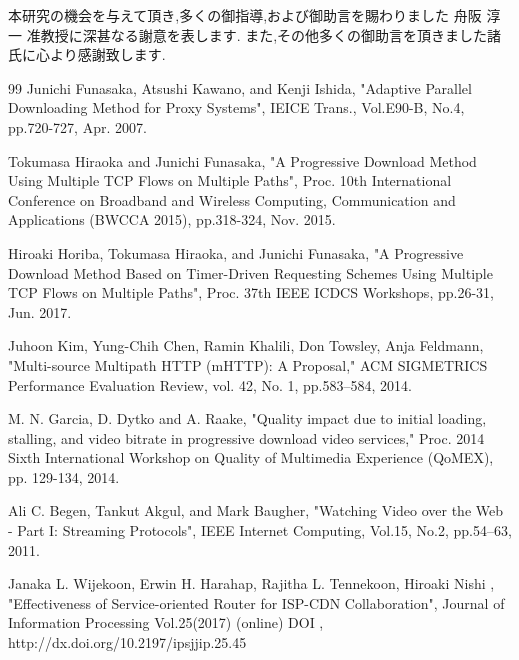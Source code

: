 \documentclass[a4j,12pt]{gradthesis_utf8}
\begin{document}
\clearpage
%
\begin{acknowledgment}
 本研究の機会を与えて頂き,多くの御指導,および御助言を賜わりました
舟阪 淳一 准教授に深甚なる謝意を表します.
また,その他多くの御助言を頂きました諸氏に心より感謝致します.
\end{acknowledgment}
\begin{flushleft}
\begin {thebibliography}{99} 
Junichi Funasaka, Atsushi Kawano, and Kenji Ishida, "Adaptive Parallel Downloading Method for Proxy Systems", IEICE Trans., Vol.E90-B, No.4, pp.720-727, Apr. 2007.

Tokumasa Hiraoka and Junichi Funasaka, "A Progressive Download Method Using Multiple TCP Flows on Multiple Paths", Proc. 10th International Conference on Broadband and Wireless Computing, Communication and Applications (BWCCA 2015), pp.318-324, Nov. 2015. 

Hiroaki Horiba, Tokumasa Hiraoka, and Junichi Funasaka, "A Progressive Download Method Based on Timer-Driven Requesting Schemes Using Multiple TCP Flows on Multiple Paths", Proc. 37th IEEE ICDCS Workshops, pp.26-31, Jun. 2017.

Juhoon Kim, Yung-Chih Chen, Ramin Khalili, Don Towsley, Anja Feldmann,
"Multi-source Multipath HTTP (mHTTP): A Proposal,"
ACM SIGMETRICS Performance Evaluation Review, vol. 42, No. 1, pp.583--584, 2014.

M. N. Garcia, D. Dytko and A. Raake, "Quality impact due to initial loading, stalling, and video bitrate in progressive download video services," Proc. 2014 Sixth International Workshop on Quality of Multimedia Experience (QoMEX), pp. 129-134, 2014.

Ali C. Begen, Tankut Akgul, and Mark Baugher, "Watching Video over the Web - Part I: Streaming Protocols", IEEE Internet Computing, Vol.15, No.2, pp.54--63, 2011.

\newpage

Janaka L. Wijekoon, Erwin H. Harahap, Rajitha L. Tennekoon, Hiroaki Nishi
, "Effectiveness of Service-oriented Router for ISP-CDN Collaboration", Journal of Information Processing Vol.25(2017) (online) DOI , http://dx.doi.org/10.2197/ipsjjip.25.45 


\end{thebibliography}
\end{flushleft}
\end{document}
